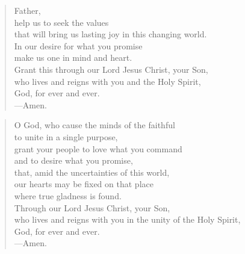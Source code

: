 \prayer

\setlength{\leftmargini}{\prayerleftmargini}

\begin{verse}
Father,\\
help us to seek the values\\
that will bring us lasting joy in this changing world.\\
In our desire for what you promise\\
make us one in mind and heart.\\
Grant this through our Lord Jesus Christ, your Son,\\
who lives and reigns with you and the Holy Spirit,\\
God, for ever and ever.\\
{\color{red}---\thinspace}Amen.
\end{verse}


\begin{verse}
O God, who cause the minds of the faithful\\
to unite in a single purpose,\\
grant your people to love what you command\\
and to desire what you promise,\\
that, amid the uncertainties of this world,\\
our hearts may be fixed on that place\\
where true gladness is found.\\
Through our Lord Jesus Christ, your Son,\\
who lives and reigns with you in the unity of the Holy Spirit,\\
God, for ever and ever.\\
{\color{red}---\thinspace}Amen.
\end{verse}

\setlength{\leftmargini}{\defleftmargini}